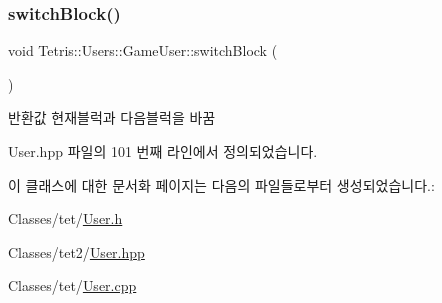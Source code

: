 \subsubsection{\texorpdfstring{switch\+Block()}{switchBlock()}\hspace{0.1cm}{\footnotesize\ttfamily [2/2]}}
{\footnotesize\ttfamily void Tetris\+::\+Users\+::\+Game\+User\+::switch\+Block (\begin{DoxyParamCaption}{ }\end{DoxyParamCaption})\hspace{0.3cm}{\ttfamily [inline]}}

\begin{DoxyReturn}{반환값}
현재블럭과 다음블럭을 바꿈 
\end{DoxyReturn}


User.\+hpp 파일의 101 번째 라인에서 정의되었습니다.



이 클래스에 대한 문서화 페이지는 다음의 파일들로부터 생성되었습니다.\+:\begin{DoxyCompactItemize}
\item 
Classes/tet/\hyperlink{_user_8h}{User.\+h}\item 
Classes/tet2/\hyperlink{_user_8hpp}{User.\+hpp}\item 
Classes/tet/\hyperlink{_user_8cpp}{User.\+cpp}\end{DoxyCompactItemize}
